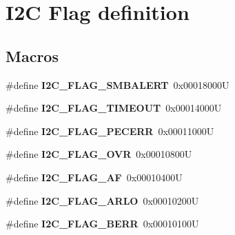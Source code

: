 \hypertarget{group___i2_c___flag__definition}{}\section{I2C Flag definition}
\label{group___i2_c___flag__definition}
\subsection*{Macros}
\begin{DoxyCompactItemize}
\item 
\mbox{\label{group___i2_c___flag__definition_ga4e1d7cd1574d03ba501c27483300c1be}} 
\#define {\bfseries I2\+C\+\_\+\+F\+L\+A\+G\+\_\+\+S\+M\+B\+A\+L\+E\+RT}~0x00018000U
\item 
\mbox{\label{group___i2_c___flag__definition_ga89c8d5d8ccc77a8619fafe9b39d1cc74}} 
\#define {\bfseries I2\+C\+\_\+\+F\+L\+A\+G\+\_\+\+T\+I\+M\+E\+O\+UT}~0x00014000U
\item 
\mbox{\label{group___i2_c___flag__definition_ga6c7addb6413f165f42bcc87506ea8467}} 
\#define {\bfseries I2\+C\+\_\+\+F\+L\+A\+G\+\_\+\+P\+E\+C\+E\+RR}~0x00011000U
\item 
\mbox{\label{group___i2_c___flag__definition_gab579673c8ac920db199aa7f18e547fb3}} 
\#define {\bfseries I2\+C\+\_\+\+F\+L\+A\+G\+\_\+\+O\+VR}~0x00010800U
\item 
\mbox{\label{group___i2_c___flag__definition_ga2f89dbba9b964e6ade1480705e7a97d4}} 
\#define {\bfseries I2\+C\+\_\+\+F\+L\+A\+G\+\_\+\+AF}~0x00010400U
\item 
\mbox{\label{group___i2_c___flag__definition_gae1e67936f4780e42b8bbe04ac9c20a7b}} 
\#define {\bfseries I2\+C\+\_\+\+F\+L\+A\+G\+\_\+\+A\+R\+LO}~0x00010200U
\item 
\mbox{\label{group___i2_c___flag__definition_ga0454176b6ddd5c402abc3ef5953a21ad}} 
\#define {\bfseries I2\+C\+\_\+\+F\+L\+A\+G\+\_\+\+B\+E\+RR}~0x00010100U
\item 

\end{DoxyCompactItemize}
